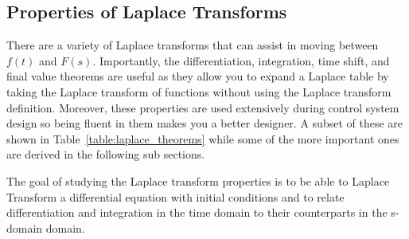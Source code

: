 \documentclass[12pt,letter]{article}
\begin{document}
\subsection{Properties of Laplace Transforms}


There are a variety of Laplace transforms that can assist in moving between $f(t)$ and $F(s)$. Importantly, the differentiation, integration, time shift, and final value theorems are useful as they allow you to expand a Laplace table by taking the Laplace transform of functions without using the Laplace transform definition. Moreover, these properties are used extensively during control system design so being fluent in them makes you a better designer. A subset of these are shown in Table~\ref{table:laplace_theorems} while some of the more important ones are derived in the following sub sections. 

The goal of studying the Laplace transform properties is to be able to Laplace Transform a differential equation with initial conditions and to relate differentiation and integration in the time domain to their counterparts in the s-domain domain. 
\end{document}
